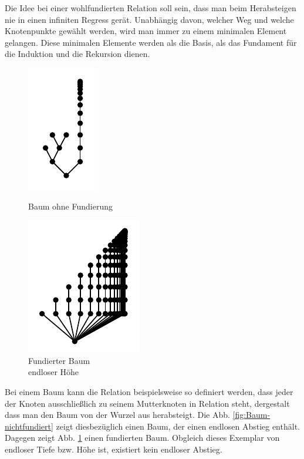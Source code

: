 \noindent
Die Idee bei einer wohlfundierten Relation soll sein, dass man beim
Herabsteigen nie in einen infiniten Regress gerät.
Unabhängig davon, welcher Weg und welche Knotenpunkte gewählt
werden, wird man immer zu einem minimalen Element gelangen.
Diese minimalen Elemente werden als die Basis, als das Fundament für
die Induktion und die Rekursion dienen.

\begin{figure}\setlength{\abovecaptionskip}{0pt}
\centering
\begin{minipage}[t]{0.45\textwidth}
\begin{center}
\includegraphics{img/Baum-nichtfundiert.pdf}
\caption{Baum ohne Fundierung\\ \phantom{Text}}
\label{fig:Baum-nichtfundiert}
\end{center}
\end{minipage}
\begin{minipage}[t]{0.45\textwidth}
\begin{center}
\includegraphics{img/Baum-fundiert.pdf}
\caption{Fundierter Baum\\ endloser Höhe}
\label{fig:Baum-fundiert}
\end{center}
\end{minipage}
\end{figure}

Bei einem Baum kann die Relation beispielsweise so definiert werden,
dass jeder der Knoten ausschließlich zu seinem Mutterknoten in Relation steht,
dergestalt dass man den Baum von der Wurzel aus herabsteigt. Die Abb.
\ref{fig:Baum-nichtfundiert} zeigt diesbezüglich einen Baum, der
einen endlosen Abstieg enthält. Dagegen zeigt Abb. \ref{fig:Baum-fundiert}
einen fundierten Baum. Obgleich dieses Exemplar von endloser Tiefe bzw.
Höhe ist, existiert kein endloser Abstieg.

